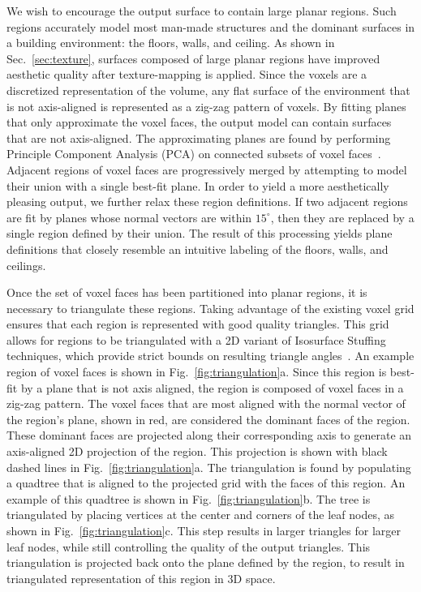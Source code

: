 \documentclass[10pt,twocolumn,twoside]{IEEEtran}
\begin{document}
We wish to encourage the output surface to contain large planar regions.  Such regions accurately model most man-made structures and the dominant surfaces in a building environment: the floors, walls, and ceiling.  As shown in Sec.~\ref{sec:texture}, surfaces composed of large planar regions have improved aesthetic quality after texture-mapping is applied.  Since the voxels are a discretized representation of the volume, any flat surface of the environment that is not axis-aligned is represented as a zig-zag pattern of voxels.  By fitting planes that only approximate the voxel faces, the output model can contain surfaces that are not axis-aligned.  The approximating planes are found by performing Principle Component Analysis (PCA) on connected subsets of voxel faces~\cite{PCA}.  Adjacent regions of voxel faces are progressively merged by attempting to model their union with a single best-fit plane.  In order to yield a more aesthetically pleasing output, we further relax these region definitions.  If two adjacent regions are fit by planes whose normal vectors are within $15^{\circ}$, then they are replaced by a single region defined by their union.  The result of this processing yields plane definitions that closely resemble an intuitive labeling of the floors, walls, and ceilings. 

Once the set of voxel faces has been partitioned into planar regions, it is necessary to triangulate these regions.  Taking advantage of the existing voxel grid ensures that each region is represented with good quality triangles.  This grid allows for regions to be triangulated with a 2D variant of Isosurface Stuffing techniques, which provide strict bounds on resulting triangle angles~\cite{Isostuffing}.  An example region of voxel faces is shown in Fig.~\ref{fig:triangulation}a.  Since this region is best-fit by a plane that is not axis aligned, the region is composed of voxel faces in a zig-zag pattern.  The voxel faces that are most aligned with the normal vector of the region's plane, shown in red, are considered the dominant faces of the region.  These dominant faces are projected along their corresponding axis to generate an axis-aligned 2D projection of the region.  This projection is shown with black dashed lines in Fig.~\ref{fig:triangulation}a.  The triangulation is found by populating a quadtree that is aligned to the projected grid with the faces of this region.  An example of this quadtree is shown in Fig.~\ref{fig:triangulation}b.  The tree is triangulated by placing vertices at the center and corners of the leaf nodes, as shown in Fig.~\ref{fig:triangulation}c.  This step results in larger triangles for larger leaf nodes, while still controlling the quality of the output triangles.  This triangulation is projected back onto the plane defined by the region, to result in triangulated representation of this region in 3D space.
\end{document}
